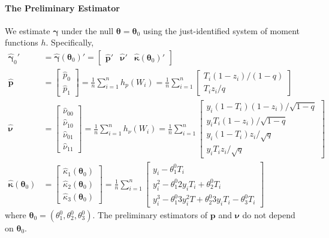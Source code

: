 \documentclass[12pt]{article}
\begin{document}
\paragraph{The Preliminary Estimator}
We estimate $\boldsymbol{\gamma}$ under the null $\boldsymbol{\theta} = \boldsymbol{\theta}_0$ using the just-identified system of moment functions $h$.
Specifically, 
\begin{align*}
  \widehat{\boldsymbol{\gamma}}_0' &= \widehat{\boldsymbol{\gamma}}(\boldsymbol{\theta}_0)' = \left[
\begin{array}{ccc}
  \widehat{\mathbf{p}}' & \widehat{\boldsymbol{\nu}}' &  \widehat{\boldsymbol{\kappa}}(\boldsymbol{\theta}_0)'
\end{array}
\right]\\
\widehat{\mathbf{p}} &= 
\left[
\begin{array}{c}
  \widehat{p}_0 \\ \widehat{p}_1
\end{array}
\right] = \frac{1}{n} \sum_{i=1}^n h_p(W_i) =
\frac{1}{n}\sum_{i=1}^n \left[
\begin{array}{l}
  T_i (1-z_i)/(1-q)\\
  T_i z_i / q
\end{array}
\right] \\
\widehat{\boldsymbol{\nu}} &= \left[
\begin{array}{c}
  \widehat{\nu}_{00} \\ 
  \widehat{\nu}_{10} \\ 
  \widehat{\nu}_{01} \\ 
  \widehat{\nu}_{11}
\end{array}
\right] = \frac{1}{n}\sum_{i=1}^n h_\nu(W_i) = \frac{1}{n} \sum_{i=1}^n \left[
\begin{array}{l}
  y_i (1 - T_i) (1-z_i) / \sqrt{1-q} \\
  y_i T_i (1-z_i) / \sqrt{1-q} \\
  y_i (1 - T_i) z_i / \sqrt{q} \\
  y_i T_i z_i/\sqrt{q} 
\end{array}
\right]\\
\widehat{\boldsymbol{\kappa}}(\boldsymbol{\theta}_0) &= 
\left[
\begin{array}{c}
  \widehat{\kappa}_1(\boldsymbol{\theta}_0)\\
  \widehat{\kappa}_2(\boldsymbol{\theta}_0)\\
  \widehat{\kappa}_3(\boldsymbol{\theta}_0)
\end{array}
\right] = \frac{1}{n} \sum_{i=1}^n\left[
  \begin{array}{l}
 y_i - \theta_1^0 T_i\\
 y^2_i - \theta_1^0 2 y_i T_i + \theta_2^0 T_i\\
 y^3_i - \theta_1^0 3y_i^2 T + \theta_2^0 3y_iT_i - \theta_3^0 T_i
  \end{array}
\right]
\end{align*}
where $\boldsymbol{\theta}_0 = (\theta_1^0, \theta_2^0, \theta_3^0)$.
The preliminary estimators of $\boldsymbol{p}$ and $\boldsymbol{\nu}$ do not depend on $\boldsymbol{\theta}_0$.
\end{document}
